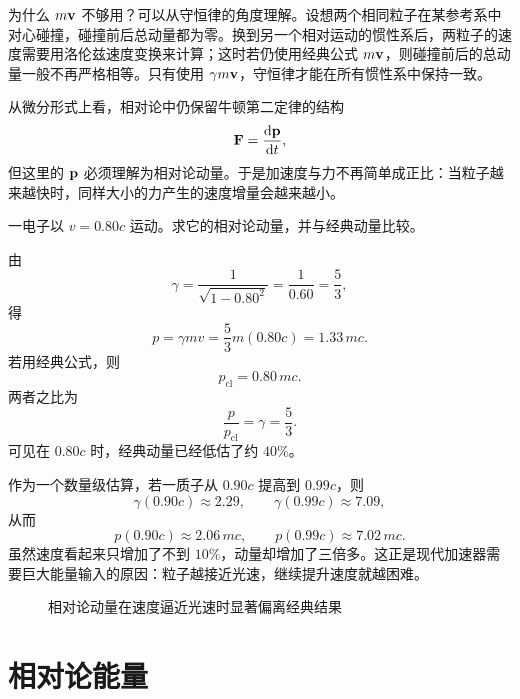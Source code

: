 为什么 $m\vb{v}$ 不够用？可以从守恒律的角度理解。设想两个相同粒子在某参考系中对心碰撞，碰撞前后总动量都为零。换到另一个相对运动的惯性系后，两粒子的速度需要用洛伦兹速度变换来计算；这时若仍使用经典公式 $m\vb{v}$，则碰撞前后的总动量一般不再严格相等。只有使用 $\gamma m\vb{v}$，守恒律才能在所有惯性系中保持一致。

从微分形式上看，相对论中仍保留牛顿第二定律的结构
\[
\vb{F}=\dv{\vb{p}}{t},
\]
但这里的 $\vb{p}$ 必须理解为相对论动量。于是加速度与力不再简单成正比：当粒子越来越快时，同样大小的力产生的速度增量会越来越小。

\begin{example}[高速电子的动量]
一电子以 $v=0.80c$ 运动。求它的相对论动量，并与经典动量比较。

由
\[
\gamma = \frac{1}{\sqrt{1-0.80^2}}=\frac{1}{0.60}=\frac53,
\]
得
\[
 p=\gamma mv = \frac53 m(0.80c)=1.33\,mc.
\]
若用经典公式，则
\[
 p_{\text{cl}}=0.80\,mc.
\]
两者之比为
\[
\frac{p}{p_{\text{cl}}}=\gamma=\frac53.
\]
可见在 $0.80c$ 时，经典动量已经低估了约 $40\%$。
\end{example}

作为一个数量级估算，若一质子从 $0.90c$ 提高到 $0.99c$，则
\[
\gamma(0.90c)\approx 2.29,
\qquad
\gamma(0.99c)\approx 7.09,
\]
从而
\[
 p(0.90c)\approx 2.06\,mc,
 \qquad
 p(0.99c)\approx 7.02\,mc.
\]
虽然速度看起来只增加了不到 $10\%$，动量却增加了三倍多。这正是现代加速器需要巨大能量输入的原因：粒子越接近光速，继续提升速度就越困难。

\begin{figure}[htbp]
\centering
{}
\caption{相对论动量在速度逼近光速时显著偏离经典结果}
\end{figure}

\section{相对论能量}

